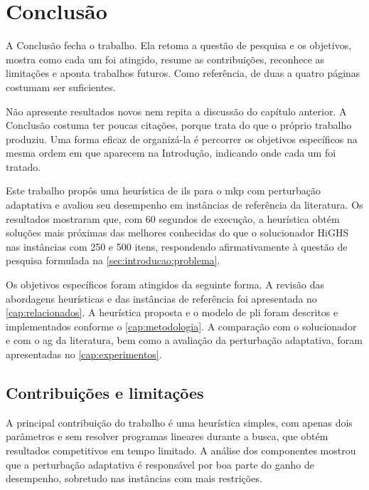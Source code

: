 \chapter{Conclusão}
\label{cap:conclusao}

\begin{instrucao}
A Conclusão fecha o trabalho. Ela retoma a questão de pesquisa e os objetivos,
mostra como cada um foi atingido, resume as contribuições, reconhece as
limitações e aponta trabalhos futuros. Como referência, de duas a quatro
páginas costumam ser suficientes.

Não apresente resultados novos nem repita a discussão do capítulo anterior. A
Conclusão costuma ter poucas citações, porque trata do que o próprio trabalho
produziu. Uma forma eficaz de organizá-la é percorrer os objetivos
específicos na mesma ordem em que aparecem na Introdução, indicando onde cada
um foi tratado.
\end{instrucao}

Este trabalho propôs uma heurística de \acs{ils} para o \acs{mkp} com
perturbação adaptativa e avaliou seu desempenho em instâncias de referência da
literatura. Os resultados mostraram que, com 60 segundos de execução, a
heurística obtém soluções mais próximas das melhores conhecidas do que o
solucionador HiGHS nas instâncias com 250 e 500 itens, respondendo
afirmativamente à questão de pesquisa formulada na
\cref{sec:introducao:problema}.

Os objetivos específicos foram atingidos da seguinte forma. A revisão das
abordagens heurísticas e das instâncias de referência foi apresentada no
\cref{cap:relacionados}. A heurística proposta e o modelo de \acs{pli} foram
descritos e implementados conforme o \cref{cap:metodologia}. A comparação com
o solucionador e com o \acs{ag} da literatura, bem como a avaliação da
perturbação adaptativa, foram apresentadas no \cref{cap:experimentos}.

\section{Contribuições e limitações}
\label{sec:conclusao:contribuicoes}

A principal contribuição do trabalho é uma heurística simples, com apenas dois
parâmetros e sem resolver programas lineares durante a busca, que obtém
resultados competitivos em tempo limitado. A análise dos componentes mostrou
que a perturbação adaptativa é responsável por boa parte do ganho de
desempenho, sobretudo nas instâncias com mais restrições.

